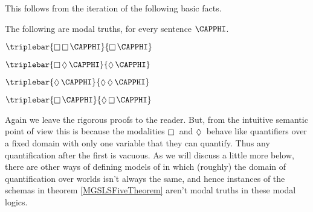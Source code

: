 This follows from the iteration of the following basic facts.
\begin{majorILnc}{} The following are modal truths, for every sentence $\CAPPHI$.
\begin{multicols}{2}
\begin{cenumerate}
\item $\triplebar{\BOX\BOX\CAPPHI}{\BOX\CAPPHI}$
\item $\triplebar{\BOX\DIAMOND\CAPPHI}{\DIAMOND\CAPPHI}$
\item $\triplebar{\DIAMOND\CAPPHI}{\DIAMOND\DIAMOND\CAPPHI}$
\item $\triplebar{\BOX\CAPPHI}{\DIAMOND\BOX\CAPPHI}$
\end{cenumerate}
\end{multicols}
\end{majorILnc}
\noindent{}Again we leave the rigorous proofs to the reader.
But, from the intuitive semantic point of view this is because the modalities $\BOX$ and $\DIAMOND$ behave like quantifiers over a fixed domain with only one variable that they can quantify. 
Thus any quantification after the first is vacuous. 
As we will discuss a little more below, there are other ways of defining models of \MGSL{} in which (roughly) the domain of quantification over worlds isn't always the same, and hence instances of the schemas in theorem \ref{MGSLSFiveTheorem} aren't modal truths in these modal logics.

